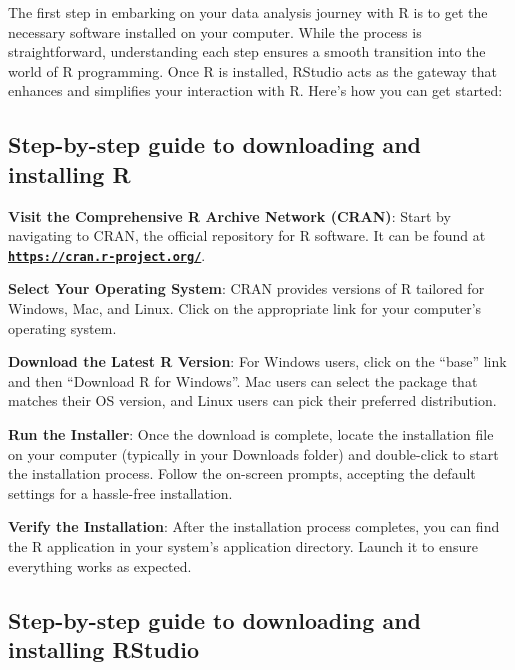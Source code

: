 \documentclass[
  b5paper]{book}
\begin{document}
The first step in embarking on your data analysis journey with R is to get the necessary software installed on your computer. While the process is straightforward, understanding each step ensures a smooth transition into the world of R programming. Once R is installed, RStudio acts as the gateway that enhances and simplifies your interaction with R. Here's how you can get started:

\hypertarget{step-by-step-guide-to-downloading-and-installing-r}{%
\subsection*{Step-by-step guide to downloading and installing R}\label{step-by-step-guide-to-downloading-and-installing-r}}

\textbf{Visit the Comprehensive R Archive Network (CRAN)}: Start by navigating to CRAN, the official repository for R software. It can be found at \href{https://cran.r-project.org/}{\textbf{\texttt{https://cran.r-project.org/}}}.

\textbf{Select Your Operating System}: CRAN provides versions of R tailored for Windows, Mac, and Linux. Click on the appropriate link for your computer's operating system.

\textbf{Download the Latest R Version}: For Windows users, click on the ``base'' link and then ``Download R for Windows''. Mac users can select the package that matches their OS version, and Linux users can pick their preferred distribution.

\textbf{Run the Installer}: Once the download is complete, locate the installation file on your computer (typically in your Downloads folder) and double-click to start the installation process. Follow the on-screen prompts, accepting the default settings for a hassle-free installation.

\textbf{Verify the Installation}: After the installation process completes, you can find the R application in your system's application directory. Launch it to ensure everything works as expected.

\hypertarget{step-by-step-guide-to-downloading-and-installing-rstudio}{%
\subsection*{Step-by-step guide to downloading and installing RStudio}\label{step-by-step-guide-to-downloading-and-installing-rstudio}}
\end{document}
